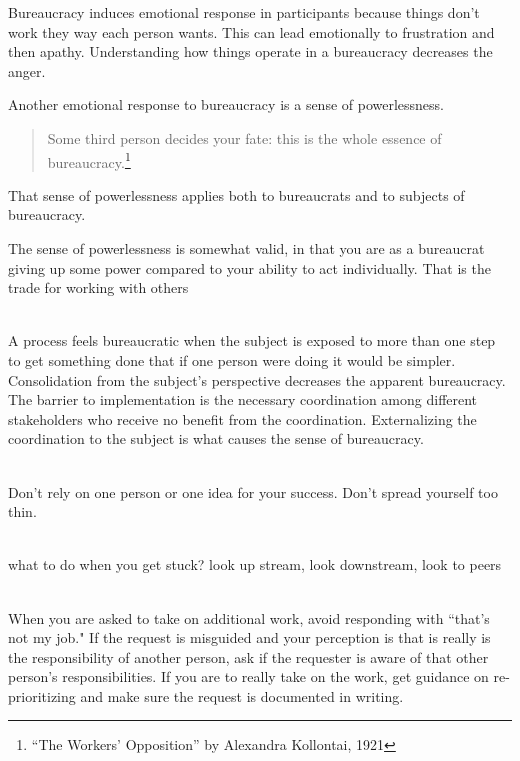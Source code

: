 Bureaucracy induces emotional response in participants because things don't work they way each person wants. This can lead emotionally to frustration and then apathy. Understanding how things operate in a bureaucracy decreases the anger.


Another emotional response to bureaucracy is a sense of powerlessness. 
\begin{quote}
Some third person decides your fate: this is the whole essence of bureaucracy.\footnote{``The Workers' Opposition'' by Alexandra Kollontai, 1921}
\end{quote}
That sense of powerlessness applies both to bureaucrats and to subjects of bureaucracy. 

The sense of powerlessness is somewhat valid, in that you are as a bureaucrat giving up some power compared to your ability to act individually. That is the trade for working with others

\ \\

A process feels bureaucratic when the subject is exposed to more than one step to get something done that if one person were doing it would be simpler. Consolidation from the subject's perspective decreases the apparent bureaucracy. The barrier to implementation is the necessary coordination among different stakeholders who receive no benefit from the coordination. Externalizing the coordination to the subject is what causes the sense of bureaucracy. 


\ \\

Don't rely on one person or one idea for your success. Don't spread yourself too thin. 

\ \\

what to do when you get stuck?
look up stream, look downstream, look to peers

\ \\

When you are asked to take on additional work, avoid responding with ``that's not my job." If the request is misguided and your perception is that is really is the responsibility of another person, ask if the requester is aware of that other person's responsibilities. If you are to really take on the work, get guidance on re-prioritizing and make sure the request is documented in writing. 

